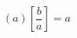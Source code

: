\documentclass{article}
\begin{document}
\[
	\left(a\right)\left[\frac{b}{a}\right]=a\,
\]
\end{document}
